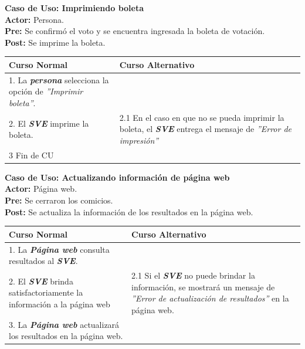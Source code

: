 \documentclass[spanish, 10pt,a4paper]{article}
\numberwithin{equation}{section} %
\begin{document}
\newpage
\noindent\textbf{Caso de Uso: Imprimiendo boleta}\\
\textbf{Actor: } Persona.\\
\textbf{Pre: } Se confirmó el voto y se encuentra ingresada la boleta de votación.\\
\textbf{Post: } Se imprime la boleta.\\
\begin{table}[H]
  \centering
\bgroup
\def\arraystretch{1.3}
  \begin{tabular}{p{9cm} | p{7cm}}
    \hline
    Curso Normal & Curso Alternativo \\
    \hline
    \hline    
    1. La \textbf{\textit{persona}} selecciona la opción de \textit{''Imprimir boleta''}. 
    & \\
    
    \hline
    2. El \textbf{\textit{SVE}} imprime la boleta.
    &
    2.1 En el caso en que no se pueda imprimir la boleta, el \textbf{\textit{SVE}} entrega el mensaje de \textit{''Error de impresión''}
    \\
    
    \hline
    3 Fin de CU
    & \\
    \hline
  \end{tabular}
\egroup
\end{table}


\noindent\textbf{Caso de Uso: Actualizando información de página web}\\
\textbf{Actor: } Página web.\\
\textbf{Pre: } Se cerraron los comicios.\\
\textbf{Post: } Se actualiza la información de los resultados en la página web.\\
\begin{table}[H]
  \centering
  \begin{tabular}{p{9cm} | p{7cm}}
    \hline
    Curso Normal & Curso Alternativo \\
    \hline
    \hline    
    1. La \textbf{\textit{Página web}} consulta resultados al \textbf{\textit{SVE}}. 
    & \\
    
    \hline
    2. El \textbf{\textit{SVE}} brinda satisfactoriamente la información a la página web
    & 
    2.1 Si el \textbf{\textit{SVE}} no puede brindar la información, se mostrará un mensaje de \textit{''Error de actualización de resultados''} en la página web.
    \\
    
    \hline
    3. La \textbf{\textit{Página web}} actualizará los resultados en la página web.
    & \\
    \hline
  \end{tabular}
\end{table}
\end{document}
